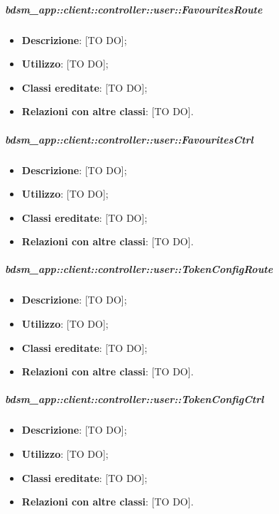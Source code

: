 		\subparagraph{bdsm\_app::client::controller::user::FavouritesRoute} %
		\label{subp:bdsm_app_client_controller_user_favouritesroute}
			\begin{itemize}
				\item \textbf{Descrizione}: [TO DO];
				\item \textbf{Utilizzo}: [TO DO];
				\item \textbf{Classi ereditate}: [TO DO];
				\item \textbf{Relazioni con altre classi}: [TO DO].
			\end{itemize}

		\subparagraph{bdsm\_app::client::controller::user::FavouritesCtrl} %
		\label{subp:client_controller_user_favouritesctrl}
			\begin{itemize}
				\item \textbf{Descrizione}: [TO DO];
				\item \textbf{Utilizzo}: [TO DO];
				\item \textbf{Classi ereditate}: [TO DO];
				\item \textbf{Relazioni con altre classi}: [TO DO].
			\end{itemize}

		\subparagraph{bdsm\_app::client::controller::user::TokenConfigRoute} %
		\label{subp:bdsm_app_client_controller_user_tokenconfigroute}
			\begin{itemize}
				\item \textbf{Descrizione}: [TO DO];
				\item \textbf{Utilizzo}: [TO DO];
				\item \textbf{Classi ereditate}: [TO DO];
				\item \textbf{Relazioni con altre classi}: [TO DO].
			\end{itemize}

		\subparagraph{bdsm\_app::client::controller::user::TokenConfigCtrl} %
		\label{subp:client_controller_user_tokenconfigctrl}
			\begin{itemize}
				\item \textbf{Descrizione}: [TO DO];
				\item \textbf{Utilizzo}: [TO DO];
				\item \textbf{Classi ereditate}: [TO DO];
				\item \textbf{Relazioni con altre classi}: [TO DO].
			\end{itemize}

